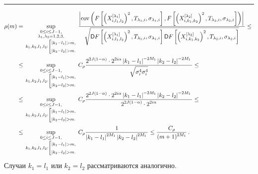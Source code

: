 \hrule

\begin{align}
\rho(m)
&=\sup\limits_{{\begin{smallmatrix}0\leq i\leq J-1,\\
\lambda_1, \lambda_2= 1,2,3, \\
k_1,k_2,l_1,l_2:\left[ \begin{gathered}{\scriptstyle |k_1-l_1|>m,}\\
  {\scriptstyle |k_2-l_2|>m.}\end{gathered} \right.\end{smallmatrix}}}
   \fr{\abs{\cov\left(F\left[\left(X_{i,l_1,l_2}^{[\lambda_1]}\right)^2,
   T_{\lambda_1,i},\sigma_{\lambda_1,i}\right],F\left[\left(X_{i,k_1,k_2}^{[\lambda_2]}\right)^2,
   T_{\lambda_2,i},\sigma_{\lambda_2,i}\right]\right)}}
   {\sqrt{\Variance F\left[\left(X_{i,l_1,l_2}^{[\lambda_1]}\right)^2,
   T_{\lambda_1,i},\sigma_{\lambda_1,i}\right]
   \Variance F\left[\left(X_{i,k_1,k_2}^{[\lambda_2]}\right)^2,T_{\lambda_2,i},
   \sigma_{\lambda_2,i}\right]}}\leq{}\notag\\
&\leq \sup\limits_{{\begin{smallmatrix}0\leq i\leq
J-1,\\k_1,k_2,l_1,l_2:\left[ \begin{gathered}
{\scriptstyle |k_1-l_1|>m,}\\
{\scriptstyle |k_2-l_2|>m.}
\end{gathered} \right.\end{smallmatrix}}}
C_\rho\fr{2^{2J(1-\alpha)}\cdot2^{2i\alpha}\left\vert k_1-l_1\right\vert^{-2M_1}
\left\vert k_2-l_2\right\vert^{-2M_1}}
{\sqrt{\sigma^4_i\sigma^4_i}}\leq{}\notag\\
&{}\leq \sup\limits_{{\begin{smallmatrix}0\leq i\leq J-1,\\
k_1,k_2,l_1,l_2:\left[ \begin{gathered}
{\scriptstyle |k_1-l_1|>m,}\\ {\scriptstyle  |k_2-l_2|>m.}\end{gathered}
\right.\end{smallmatrix}}}
C_\rho \fr{2^{2J(1-\alpha)}\cdot 2^{2i\alpha}\left\vert k_1-l_1\right\vert^{-2M_1}
\left\vert k_2-l_2\right\vert^{-2M_1}}
{2^{2J(1-\alpha)}\cdot 2^{2i\alpha}}\leq{}\notag\\
&{}\leq \sup\limits_{{\begin{smallmatrix}0\leq
i\leq J-1,\\k_1,k_2,l_1,l_2:\left[
\begin{gathered}
{\scriptstyle |k_1-l_1|>m,}\\ {\scriptstyle  |k_2-l_2|>m.}\end{gathered}
\right.\end{smallmatrix}}}
C_\rho\fr{1}{\left\vert k_1-l_1\right\vert^{2M_1}\left\vert k_2-l_2\right\vert^{2M_1}}
\leq \fr{C_\rho}{(m+1)^{2M_1}} \,.
\label{rho_1}
\end{align}
%
Случаи $k_1 = l_1$ или $k_2 = l_2$ рассматриваются аналогично.

